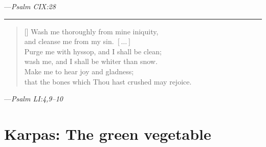 \documentclass[letter,11pt,openany]{memoir}
\newcommand{\HgEllipsis}{\ensuremath{\left[\ldots\right]}}
\newcommand{\HgSource}[1]{\hfill{\small---\itshape{#1}}}
\newcommand{\HgFill}{
\vfill \hrule 
\vfill}
\newcommand{\SSrc}{\textsuperscript{\upshape{[S]}}}
\begin{document}
\HgSource{Psalm CIX:28 \SSrc}

\HgFill

\settowidth{\versewidth}{\vin that the bones which Thou hast crushed may rejoice} 
\begin{verse}
	[\versewidth] Wash me thoroughly from mine iniquity, \\
	\vin and cleanse me from my sin. \HgEllipsis \\
	Purge me with hyssop, and I shall be clean; \\
	\vin wash me, and I shall be whiter than snow. \\
	Make me to hear joy and gladness; \\
	\vin that the bones which Thou hast crushed may rejoice. 
\end{verse}
\HgSource{Psalm LI:4,9--10 \SSrc}

% 
%
\chapter*{Karpas: The green vegetable}

\vfill
\end{document}
